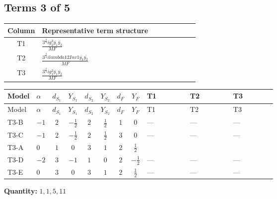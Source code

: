 \documentclass[8pt]{article}
\begin{document}
\begin{landscape}
\subsection*{Terms 3 of 5}
\begin{center}
\begin{tabular}{@{}c >{\raggedright\arraybackslash}p{0.82\linewidth}@{}}
\toprule
Column & Representative term structure \\
\midrule
T1 & \(\displaystyle \frac{3^{\frac{3}{4}} i g_{2}^{2} \overline{y_{1}} \overline{y_{2}}}{MF}\) \\
\midrule
T2 & \(\displaystyle \frac{3^{\frac{3}{4}} i lambda12Inv1 \overline{y_{1}} \overline{y_{2}}}{MF}\) \\
\midrule
T3 & \(\displaystyle \frac{3^{\frac{3}{4}} i g_{1}^{2} \overline{y_{1}} \overline{y_{2}}}{MF}\) \\
\midrule
\bottomrule
\end{tabular}
\end{center}
\smallskip
\tiny
\begin{longtable}{@{}llcccccc >{\raggedright\arraybackslash}p{0.21\linewidth} >{\raggedright\arraybackslash}p{0.21\linewidth} >{\raggedright\arraybackslash}p{0.21\linewidth}@{}}
\toprule
Model & $\alpha$ & $d_{S_1}$ & $Y_{S_1}$ & $d_{S_2}$ & $Y_{S_2}$ & $d_F$ & $Y_F$ & T1 & T2 & T3 \\
\midrule
\endfirsthead
\toprule
Model & $\alpha$ & $d_{S_1}$ & $Y_{S_1}$ & $d_{S_2}$ & $Y_{S_2}$ & $d_F$ & $Y_F$ & T1 & T2 & T3 \\
\midrule
\endhead
T3-B & $-1$ & $2$ & $-\frac{1}{2}$ & $2$ & $\frac{1}{2}$ & $1$ & $0$ & --- & --- & --- \\
\midrule
T3-C & $-1$ & $2$ & $-\frac{1}{2}$ & $2$ & $\frac{1}{2}$ & $3$ & $0$ & --- & --- & --- \\
\midrule
T3-A & $0$ & $1$ & $0$ & $3$ & $1$ & $2$ & $\frac{1}{2}$ & \scriptsize\adjustbox{max width=\linewidth}{$\begin{gathered} - \frac{17 \cdot 3^{\frac{3}{4}} i g_{2}^{2} \overline{y_{1}} \overline{y_{2}}}{24 MF}\end{gathered}$} & \scriptsize\adjustbox{max width=\linewidth}{$\begin{gathered} - \frac{3^{\frac{3}{4}} i lambda12Inv1 \overline{y_{1}} \overline{y_{2}}}{6 MF}\end{gathered}$} & \scriptsize\adjustbox{max width=\linewidth}{$\begin{gathered} - \frac{3^{\frac{3}{4}} i g_{1}^{2} \overline{y_{1}} \overline{y_{2}}}{8 MF}\end{gathered}$} \\
\midrule
T3-D & $-2$ & $3$ & $-1$ & $1$ & $0$ & $2$ & $-\frac{1}{2}$ & --- & --- & --- \\
\midrule
T3-E & $0$ & $3$ & $0$ & $3$ & $1$ & $2$ & $\frac{1}{2}$ & --- & --- & --- \\
\midrule
\bottomrule
\end{longtable}
\clearpage
\noindent\textbf{Quantity: }$\mathrm{1,1,5,11}$\par\smallskip

\end{landscape}
\end{document}
